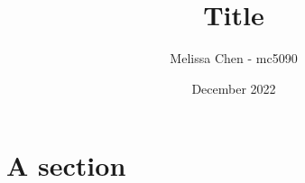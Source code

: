 \documentclass{article}
\begin{document}
\title{Title}
\date{December 2022}
\author{Melissa Chen - mc5090}

\maketitle

\section{A section}



% 
\end{document}
